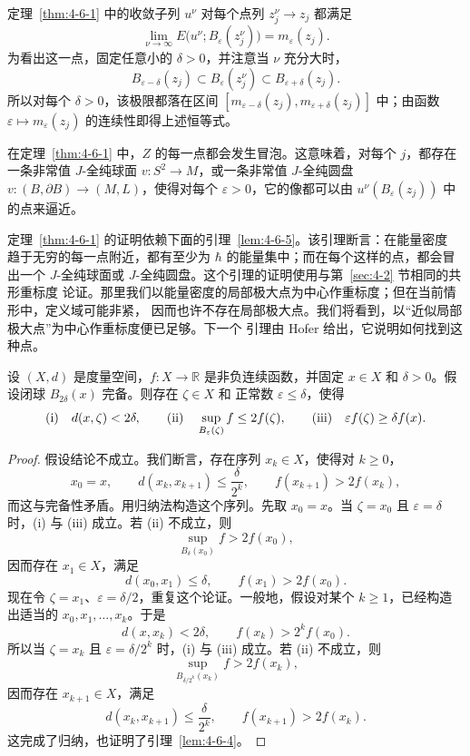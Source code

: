 \begin{remark}\label{rem:4-6-2}
定理~\ref{thm:4-6-1} 中的收敛子列 $u^\nu$ 对每个点列
$z_j^\nu\to z_j$ 都满足
\[
  \lim_{\nu\to\infty}E\bigl(u^\nu;B_\varepsilon(z_j^\nu)\bigr)
  =m_\varepsilon(z_j).
\]
为看出这一点，固定任意小的 $\delta>0$，并注意当 $\nu$ 充分大时，
\[
  B_{\varepsilon-\delta}(z_j)
  \subset B_\varepsilon(z_j^\nu)
  \subset B_{\varepsilon+\delta}(z_j).
\]
所以对每个 $\delta>0$，该极限都落在区间
$[m_{\varepsilon-\delta}(z_j),m_{\varepsilon+\delta}(z_j)]$ 中；由函数
$\varepsilon\mapsto m_\varepsilon(z_j)$ 的连续性即得上述恒等式。
\end{remark}

\begin{remark}\label{rem:4-6-3}
在定理~\ref{thm:4-6-1} 中，$Z$ 的每一点都会发生冒泡。这意味着，对每个 $j$，都存在
一条非常值 $J$-全纯球面 $v:S^2\to M$，或一条非常值 $J$-全纯圆盘
$v:(B,\partial B)\to(M,L)$，使得对每个 $\varepsilon>0$，它的像都可以由
$u^\nu(B_\varepsilon(z_j))$ 中的点来逼近。
\end{remark}

定理~\ref{thm:4-6-1} 的证明依赖下面的引理~\ref{lem:4-6-5}。该引理断言：在能量密度
趋于无穷的每一点附近，都有至少为 $\hbar$ 的能量集中；而在每个这样的点，都会冒出一个
$J$-全纯球面或 $J$-全纯圆盘。这个引理的证明使用与第~\ref{sec:4-2} 节相同的共形重标度
论证。那里我们以能量密度的局部极大点为中心作重标度；但在当前情形中，定义域可能非紧，
因而也许不存在局部极大点。我们将看到，以“近似局部极大点”为中心作重标度便已足够。下一个
引理由 Hofer 给出，它说明如何找到这种点。

\begin{lemma}\label{lem:4-6-4}
设 $(X,d)$ 是度量空间，$f:X\to\mathbb R$ 是非负连续函数，并固定
$x\in X$ 和 $\delta>0$。假设闭球 $B_{2\delta}(x)$ 完备。则存在 $\zeta\in X$ 和
正常数 $\varepsilon\le\delta$，使得
\[
  \textup{(i)}\quad d(x,\zeta)<2\delta,
  \qquad
  \textup{(ii)}\quad \sup_{B_\varepsilon(\zeta)}f\le2f(\zeta),
  \qquad
  \textup{(iii)}\quad \varepsilon f(\zeta)\ge\delta f(x).
\]
\end{lemma}

\begin{proof}
假设结论不成立。我们断言，存在序列 $x_k\in X$，使得对 $k\ge0$，
\[
  x_0=x,
  \qquad
  d(x_k,x_{k+1})\le\frac\delta{2^k},
  \qquad
  f(x_{k+1})>2f(x_k),
\]
而这与完备性矛盾。用归纳法构造这个序列。先取 $x_0=x$。当
$\zeta=x_0$ 且 $\varepsilon=\delta$ 时，(i) 与 (iii) 成立。若 (ii) 不成立，则
\[
  \sup_{B_\delta(x_0)}f>2f(x_0),
\]
因而存在 $x_1\in X$，满足
\[
  d(x_0,x_1)\le\delta,
  \qquad f(x_1)>2f(x_0).
\]
现在令 $\zeta=x_1$、$\varepsilon=\delta/2$，重复这个论证。一般地，假设对某个
$k\ge1$，已经构造出适当的 $x_0,x_1,\ldots,x_k$。于是
\[
  d(x,x_k)<2\delta,
  \qquad
  f(x_k)>2^kf(x_0).
\]
所以当 $\zeta=x_k$ 且 $\varepsilon=\delta/2^k$ 时，(i) 与 (iii) 成立。若 (ii)
不成立，则
\[
  \sup_{B_{\delta/2^k}(x_k)}f>2f(x_k),
\]
因而存在 $x_{k+1}\in X$，满足
\[
  d(x_k,x_{k+1})\le\frac\delta{2^k},
  \qquad
  f(x_{k+1})>2f(x_k).
\]
这完成了归纳，也证明了引理~\ref{lem:4-6-4}。
\end{proof}

